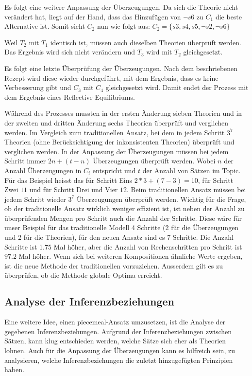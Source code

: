 \documentclass{article}
\begin{document}
 Es folgt eine weitere Anpassung der Überzeugungen. Da sich die Theorie nicht verändert hat, liegt auf der Hand, dass das Hinzufügen von $\neg s6$ zu $C_1$ die beste Alternative ist. Somit sieht $C_2$ nun wie folgt aus: $C_2 = \{s3, s4, s5, \neg s2, \neg s6\}$
 
 Weil $T_2$ mit $T_1$ identisch ist, müssen auch dieselben Theorien überprüft werden. Das Ergebnis wird sich nicht verändern und $T_3$ wird mit $T_2$ gleichgesetzt.
 
 Es folgt eine letzte Überprüfung der Überzeugungen. Nach dem beschriebenen Rezept wird diese wieder durchgeführt, mit dem Ergebnis, dass es keine Verbesserung gibt und $C_3$ mit $C_4$ gleichgesetzt wird. Damit endet der Prozess mit dem Ergebnis eines Reflective Equilibriums.
 
 Während des Prozesses mussten in der ersten Änderung sieben Theorien und in der zweiten und dritten Änderung sechs Theorien überprüft und verglichen werden.  Im Vergleich zum traditionellen Ansatz, bei dem in jedem Schritt $3^7$ Theorien (ohne Berücksichtigung der inkonsistenten Theorien) überprüft und verglichen werden. In der Anpassung der Überzeugungen müssen bei jedem Schritt immer $2n + (t-n)$ Überzeugungen überprüft werden. Wobei $n$ der Anzahl Überzeugungen in $C_i$ entspricht und $t$ der Anzahl von Sätzen im Topic. Für das Beispiel heisst das für Schritt Eins $2*3 + (7-3) = 10$, für Schritt Zwei $11$ und für Schritt Drei und Vier $12$. Beim traditionellen Ansatz müssen bei jedem Schritt wieder $3^7$ Überzeugungen überprüft werden. Wichtig für die Frage, ob der traditionelle Ansatz wirklich weniger effizient ist, ist neben der Anzahl zu überprüfenden Mengen pro Schritt auch die Anzahl der Schritte. Diese wäre für unser Beispiel für das traditionelle Modell 4 Schritte (2 für die Überzeugungen und 2 für die Theorien), für den neuen Ansatz sind es 7 Schritte. Die Anzahl Schritte ist 1.75 Mal höher, aber die Anzahl von Rechenschritten pro Schritt ist $97.2$ Mal höher. Wenn sich bei weiteren Kompositionen ähnliche Werte ergeben, ist die neue Methode der traditionellen vorzuziehen. Ausserdem gilt es zu überprüfen, ob die Methode globale Optima erreicht.

\subsection{Analyse der Inferenzbeziehungen}
Eine weitere Idee, einen piecemeal-Ansatz umzusetzen, ist die Analyse der gegebenen Inferenzbeziehungen. Aufgrund der Inferenzbeziehungen zwischen Sätzen, kann klug entschieden werden, welche Sätze sich eher als Theorien lohnen. Auch für die Anpassung der Überzeugungen kann es hilfreich sein, zu analysieren, welche Inferenzbeziehungen die zuletzt hinzugefügten Prinzipien haben.
\end{document}
